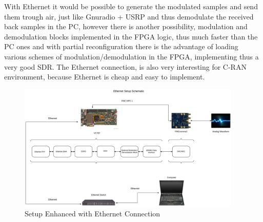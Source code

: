 With Ethernet it would be possible to generate the modulated samples and send
them trough air, just like Gnuradio + USRP and thus demodulate the received back
samples in the PC, however there is another possibility, modulation and
demodulation blocks implemented in the FPGA logic, thus much faster than the PC
ones and with partial reconfiguration there is the advantage of loading various
schemes of modulation/demodulation in the FPGA, implementing thus a very good
SDR. The Ethernet connection, is also very interesting for C-RAN
environment, because Ethernet is cheap and easy to implement.\\

\begin{figure}[htbp]
    \centering
    \includegraphics[width=0.95\textwidth]{./figures/eth_setup}
    \caption{ Setup Enhanced with Ethernet Connection
    \label{fig:setupeth}}
\end{figure}
